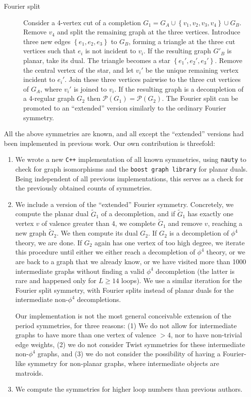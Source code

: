 \documentclass[12pt,a4paper]{article}
\newcommand{\period}{\mathcal P}
\renewcommand{\|}{\rule[-0.4ex]{0.2ex}{1.2em}}
\begin{document}
\begin{description}
	\item[Fourier split] \cite{hu_further_2022} Consider a 4-vertex cut  of a completion $G_1=G_A \cup \left \lbrace v_1,v_2,v_3,v_4 \right \rbrace \cup G_B$.  Remove $v_4$ and split the remaining graph at the three vertices.   Introduce three new edges $\left \lbrace e_1,e_2,e_3 \right \rbrace   $ to $G_B$, forming a triangle at the three cut vertices such that $e_i$ is not incident to $v_i$. If the resulting graph $G'_B$ is planar, take its dual. The triangle becomes a star $\left \lbrace e_1', e_2', e_3' \right \rbrace   $. Remove the central vertex of the star, and let $v_i'$ be the unique remaining vertex incident to $e_i'$.  Join these three vertices pairwise to the three cut vertices of $G_A$, where $v_i'$ is joined to $v_i$.  If the resulting graph is a decompletion of a 4-regular graph $G_2$ then $\period(G_1)=\period(G_2)$. The Fourier split can be promoted to an \enquote{extended} version similarly to the ordinary Fourier symmetry.
\end{description}

\noindent
All the above symmetries are known, and all except the \enquote{extended} versions had been implemented in previous work. Our own contribution is threefold:
\begin{enumerate}
	\item 	We wrote a new \texttt{C++} implementation of all known symmetries, using \texttt{nauty} \cite{mckay_practical_2014} to check for graph isomorphisms and the \texttt{boost graph library} \cite{siek_boost_2001} for planar duals. Being independent of all previous implementations, this serves as a check for the previously obtained counts of symmetries.
	\item We include a version of the \enquote{extended} Fourier symmetry. Concretely, we compute the planar dual $\tilde G_1$ of a decompletion, and if $\tilde G_1$ has exactly one vertex $v$ of valence greater than 4, we complete $\tilde G_1$ and remove $v$, reaching a new graph $\tilde G_2$. We then compute its dual $G_2$. If $G_2$ is a decompletion of $\phi^4$ theory, we are done. If $G_2$ again has one vertex of too high degree, we iterate this procedure until either we either reach a decompletion of $\phi^4$ theory, or  we are back to a graph that we already know, or we have visited more than 1000 intermediate graphs without finding a valid $\phi^4$ decompletion (the latter is rare and happened only for $L\geq 14$ loops). We use a similar iteration   for the Fourier split symmetry, with Fourier splits instead of planar duals for the intermediate non-$\phi^4$ decompletions.
	
	Our implementation is not the most general conceivable extension of the period symmetries, for three reasons: (1) We do not allow for intermediate graphs to have more than one vertex of valence $>4$, nor to have non-trivial edge weights, (2) we do not consider Twist symmetries for these intermediate non-$\phi^4$ graphs, and (3) we do not consider the possibility of having a Fourier-like symmetry for non-planar graphs, where intermediate objects are matroids. 
	\item We compute the symmetries for higher loop numbers than previous authors.
\end{enumerate}
\end{document}
